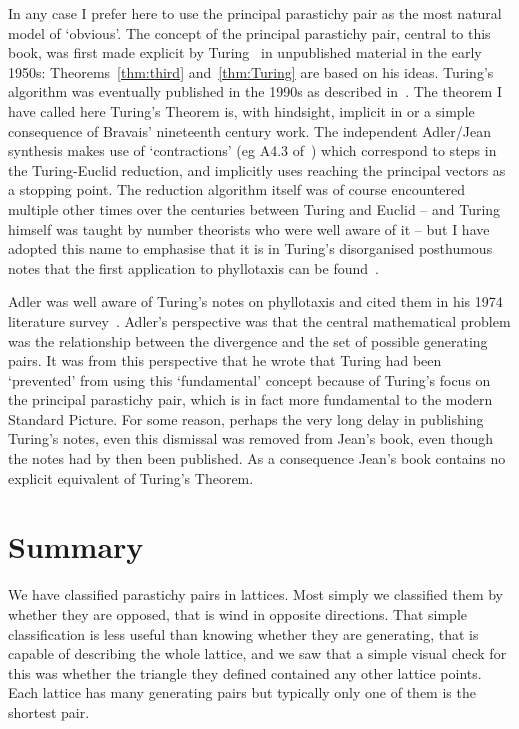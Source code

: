In any case I prefer here to use the principal parastichy pair as the most natural model of `obvious'. 
The concept of the principal parastichy pair, central to this book, was first made explicit by Turing~\autocite{turingMorphogenTheoryPhyllotaxis2013} in unpublished material in the early 1950s: Theorems~\ref{thm:third} and~\ref{thm:Turing} are based on his ideas. Turing's algorithm was eventually published in the 1990s as described in~\cite{turingMorphogenTheoryPhyllotaxis2013}. The theorem I have called here Turing's Theorem is,  with hindsight,  implicit in or a simple consequence of Bravais' nineteenth century work. 
The independent Adler/Jean synthesis  makes use of `contractions' (eg A4.3 of~\cite{jeanPhyllotaxisSystemicStudy1994}) which correspond to steps in the Turing-Euclid reduction, and implicitly uses reaching the principal  vectors as a stopping point. The reduction algorithm itself was of course encountered multiple other times over the centuries between Turing and Euclid -- and Turing himself was taught by number theorists who were well aware of it -- but I have adopted this name to emphasise that it is in Turing's disorganised posthumous notes that the first application to phyllotaxis can be found~\cite{swintonWatchingDaisiesGrow2004}. 

Adler was well aware of Turing's notes on phyllotaxis and cited them in his 1974 literature survey~\cite{adlerModelContactPressure1974}. Adler's perspective was that the central mathematical problem was the relationship between the divergence and the set of possible generating pairs. It was from this perspective that he wrote that Turing had been `prevented' from using this `fundamental' concept because of Turing's focus on the principal parastichy pair, which is in fact more fundamental to the modern Standard Picture. For some reason, perhaps the very long delay in publishing Turing's notes, even this dismissal was removed from Jean's book, even though the notes had by then been published. As a consequence Jean's book contains no explicit equivalent of Turing's Theorem. 

\section{Summary}
We have classified parastichy pairs in lattices. Most simply we classified them  by whether they are opposed, that is wind in opposite directions. That simple classification is less useful than knowing whether they are generating, that is capable of describing the whole lattice, and we saw that a simple visual check for this was whether the triangle they defined contained any other lattice points. Each lattice has many generating pairs but typically only one of them is the shortest pair. 

